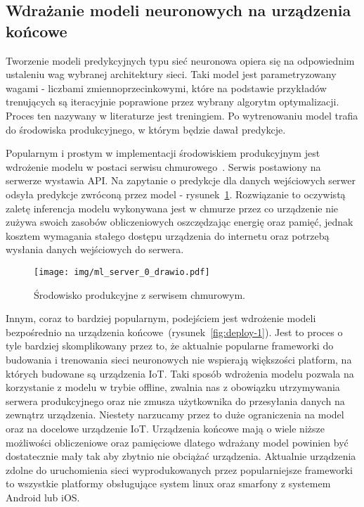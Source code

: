 \subsection{Wdrażanie modeli neuronowych na urządzenia końcowe}

Tworzenie modeli predykcyjnych typu sieć neuronowa opiera się na odpowiednim ustaleniu wag
wybranej architektury sieci. Taki model jest parametryzowany wagami - liczbami
zmiennoprzecinkowymi, które na podstawie przykładów trenujących są iteracyjnie poprawione przez
wybrany algorytm optymalizacji. Proces ten nazywany w literaturze jest treningiem. Po wytrenowaniu model trafia do środowiska produkcyjnego, w którym będzie dawał predykcje.

Popularnym i prostym w implementacji środowiskiem produkcyjnym jest wdrożenie modelu w postaci
serwisu chmurowego~\cite{ServerFacebook}. Serwis postawiony na serwerze wystawia API. Na
zapytanie o predykcje dla danych wejściowych serwer odsyła predykcje zwróconą przez model -
rysunek~\ref{fig:deploy-0}. Rozwiązanie to oczywistą zaletę inferencja modelu wykonywana jest w
chmurze przez co urządzenie nie zużywa swoich zasobów obliczeniowych oszczędzając energię oraz
pamięć, jednak kosztem wymagania stałego dostępu urządzenia do internetu oraz potrzebą wysłania
danych wejściowych do serwera.

\begin{figure}[h!]
    \centering
    \texttt{[image: img/ml\_server\_0\_drawio.pdf]}
    \caption{Środowisko produkcyjne z serwisem chmurowym.}
    \label{fig:deploy-0}
    \vspace{-4mm}
\end{figure}

Innym, coraz to bardziej popularnym, podejściem jest wdrożenie modeli bezpośrednio na urządzenia
końcowe~\cite{EdgeFacebook}(rysunek~\ref{fig:deploy-1}). Jest to proces o tyle bardziej skomplikowany przez to, że aktualnie
popularne frameworki\cite{PyTorch,Tensorflow,Mxnet} do budowania i trenowania sieci neuronowych nie
wspierają większości platform, na których budowane są urządzenia IoT. Taki sposób wdrożenia
modelu pozwala na korzystanie z modelu w trybie offline, zwalnia nas z obowiązku utrzymywania
serwera produkcyjnego oraz nie zmusza użytkownika do przesyłania danych na zewnątrz urządzenia.
Niestety narzucamy przez to duże ograniczenia na model oraz na docelowe urządzenie IoT.
Urządzenia końcowe mają o wiele niższe możliwości obliczeniowe oraz pamięciowe dlatego wdrażany
model powinien być dostatecznie mały tak aby zbytnio nie obciążać urządzenia. Aktualnie
urządzenia zdolne do uruchomienia sieci wyprodukowanych przez popularniejsze frameworki to
wszystkie platformy obsługujące system linux oraz smarfony z systemem Android lub iOS.

